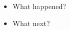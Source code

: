 \documentclass[10pt]{article}
\begin{document}
\begin{itemize}
\item What happened?
\item What next?
\end{itemize}









\end{document}
